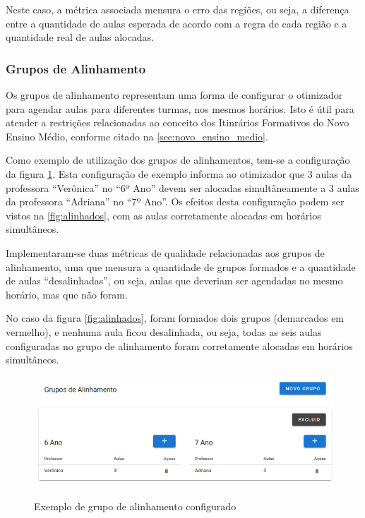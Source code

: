 Neste caso, a métrica associada mensura o erro das regiões, ou seja, a diferença entre a quantidade de aulas esperada de acordo com a regra de cada região e a quantidade real de aulas alocadas.

\newpage
\subsubsection{Grupos de Alinhamento}

Os grupos de alinhamento representam uma forma de configurar o otimizador para agendar aulas para diferentes turmas, nos mesmos horários. Isto é útil para atender a restrições relacionadas ao conceito dos Itinrários Formativos do Novo Ensino Médio, conforme citado na \autoref{sec:novo_ensino_medio}.

Como exemplo de utilização dos grupos de alinhamentos, tem-se a configuração da figura \ref{fig:gruposAlinhamento}. Esta configuração de exemplo informa ao otimizador que 3 aulas da professora ``Verônica'' no ``6º Ano'' devem ser alocadas simultâneamente a 3 aulas da professora ``Adriana'' no ``7º Ano''. Os efeitos desta configuração podem ser vistos na \ref{fig:alinhados}, com as aulas corretamente alocadas em horários simultâneos.

Implementaram-se duas métricas de qualidade relacionadas aos grupos de alinhamento, uma que mensura a quantidade de grupos formados e a quantidade de aulas ``desalinhadas'', ou seja, aulas que deveriam ser agendadas no mesmo horário, mas que não foram.

No caso da figura \ref{fig:alinhados}, foram formados dois grupos (demarcados em vermelho), e nenhuma aula ficou desalinhada, ou seja, todas as seis aulas configuradas no grupo de alinhamento foram corretamente alocadas em horários simultâneos.

\begin{figure}[h]
	\centering
	\caption{Exemplo de grupo de alinhamento configurado}
	\includegraphics[width=1\textwidth]{./dados/figuras/gruposAlinhamento}
	\label{fig:gruposAlinhamento}
\end{figure}
\pagebreak


